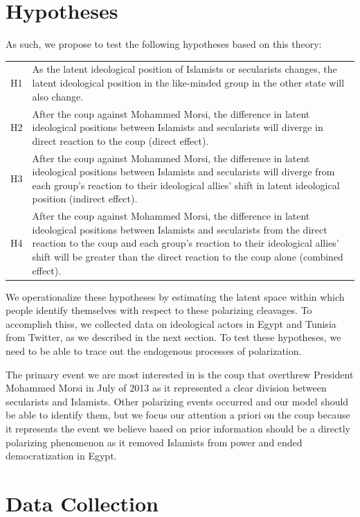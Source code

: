 \documentclass[12pt]{article}
\begin{document}
\section*{Hypotheses}

As such, we propose to test the following hypotheses based on this theory:

\begin{tabular}{lp{15cm}}
	H1 & As the latent ideological position of Islamists or secularists changes, the latent ideological position in the like-minded group in the other state will also change.\\
	H2 & After the coup against Mohammed Morsi, the difference in latent ideological positions between Islamists and secularists will diverge in direct reaction to the coup (direct effect).\\
	H3 & After the coup against Mohammed Morsi, the difference in latent ideological positions between Islamists and secularists will diverge from each group's reaction to their ideological allies' shift in latent ideological position (indirect effect).\\
	H4 & After the coup against Mohammed Morsi, the difference in latent ideological positions between Islamists and secularists from the direct reaction to the coup and each group's reaction to their ideological allies' shift will be greater than the direct reaction to the coup alone (combined effect).
\end{tabular}

We operationalize these hypotheses by estimating the latent space within which people identify themselves with respect to these polarizing cleavages. To accomplish thiss, we collected data on ideological actors in Egypt and Tunisia from Twitter, as we described in the next section. To test these hypotheses, we need to be able to trace out the endogenous processes of polarization.

The primary event we are most interested in is the coup that overthrew President Mohammed Morsi in July of 2013 as it represented a clear division between secularists and Islamists. Other polarizing events occurred and our model should be able to identify them, but we focus our attention a priori on the coup because it represents the event we believe based on prior information should be a directly polarizing phenomenon as it removed Islamists from power and ended democratization in Egypt.
 
\section*{Data Collection}
\end{document}
